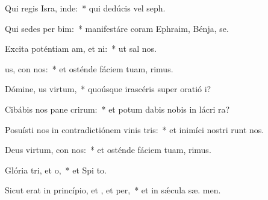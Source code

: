 \item Qui regis Isra, inde:~* qui dedúcis vel  seph.
\item Qui sedes per bim:~* manifestáre coram Ephraim, Bénja,  se.
\item Excita poténtiam am, et ni:~* ut sal  nos.
\item {}us, con nos:~* et osténde fáciem tuam,   rimus.
\item Dómine, us virtum,~* quoúsque irascéris super oratió  i?
\item Cibábis nos pane crirum:~* et potum dabis nobis in lácri  ra?
\item Posuísti nos in contradictiónem vinis tris:~* et inimíci nostri runt nos.
\item Deus virtum, con nos:~* et osténde fáciem tuam,   rimus.
\item Glória tri, et o,~* et Spi to.
\item Sicut erat in princípio, et , et per,~* et in sǽcula sæ. men.
